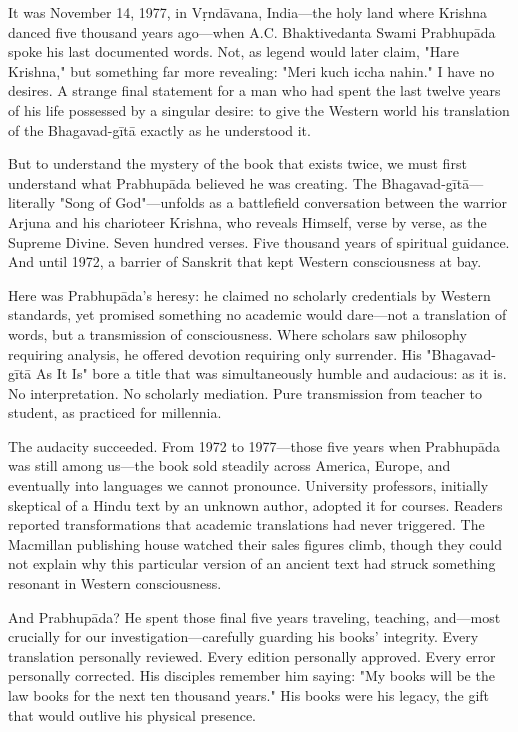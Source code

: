 \documentclass[12pt,twoside]{book}
\begin{document}
It was November 14, 1977, in Vṛndāvana, India—the holy land where Krishna danced five thousand years ago—when A.C. Bhaktivedanta Swami Prabhupāda spoke his last documented words. Not, as legend would later claim, "Hare Krishna," but something far more revealing: "Meri kuch iccha nahin." I have no desires. A strange final statement for a man who had spent the last twelve years of his life possessed by a singular desire: to give the Western world his translation of the Bhagavad-gītā exactly as he understood it.

But to understand the mystery of the book that exists twice, we must first understand what Prabhupāda believed he was creating. The Bhagavad-gītā—literally "Song of God"—unfolds as a battlefield conversation between the warrior Arjuna and his charioteer Krishna, who reveals Himself, verse by verse, as the Supreme Divine. Seven hundred verses. Five thousand years of spiritual guidance. And until 1972, a barrier of Sanskrit that kept Western consciousness at bay.

Here was Prabhupāda's heresy: he claimed no scholarly credentials by Western standards, yet promised something no academic would dare—not a translation of words, but a transmission of consciousness. Where scholars saw philosophy requiring analysis, he offered devotion requiring only surrender. His "Bhagavad-gītā As It Is" bore a title that was simultaneously humble and audacious: as it is. No interpretation. No scholarly mediation. Pure transmission from teacher to student, as practiced for millennia.

The audacity succeeded. From 1972 to 1977—those five years when Prabhupāda was still among us—the book sold steadily across America, Europe, and eventually into languages we cannot pronounce. University professors, initially skeptical of a Hindu text by an unknown author, adopted it for courses. Readers reported transformations that academic translations had never triggered. The Macmillan publishing house watched their sales figures climb, though they could not explain why this particular version of an ancient text had struck something resonant in Western consciousness.

And Prabhupāda? He spent those final five years traveling, teaching, and—most crucially for our investigation—carefully guarding his books' integrity. Every translation personally reviewed. Every edition personally approved. Every error personally corrected. His disciples remember him saying: "My books will be the law books for the next ten thousand years." His books were his legacy, the gift that would outlive his physical presence.
\end{document}
